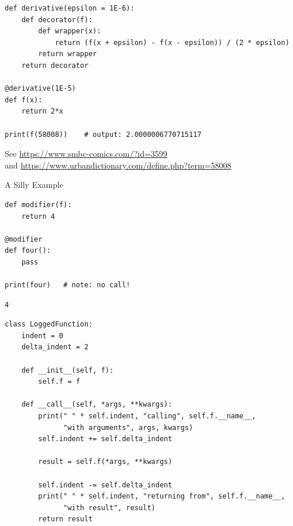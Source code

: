 \begin{frame}[fragile]
%
\begin{codebox}
\begin{verbatim}
def derivative(epsilon = 1E-6):
    def decorator(f):
        def wrapper(x):
            return (f(x + epsilon) - f(x - epsilon)) / (2 * epsilon)
        return wrapper
    return decorator

@derivative(1E-5)
def f(x):
    return 2*x

print(f(58008))    # output: 2.0000006770715117
\end{verbatim}
\end{codebox}
%
\begin{hintbox}
\footnotesize
See \url{https://www.smbc-comics.com/?id=3599} \\
and \url{https://www.urbandictionary.com/define.php?term=58008}
\end{hintbox}
%
\end{frame}


\begin{frame}[fragile]{A Silly Example}
%
\begin{codebox}
\begin{verbatim}
def modifier(f):
    return 4

@modifier
def four():
    pass

print(four)   # note: no call!
\end{verbatim}
\end{codebox}
%
\begin{cmdbox}
\begin{verbatim}
4
\end{verbatim}
\end{cmdbox}
%
\end{frame}


\begin{frame}[fragile]
%
\begin{codebox}
\begin{verbatim}
class LoggedFunction:
    indent = 0
    delta_indent = 2

    def __init__(self, f):
        self.f = f

    def __call__(self, *args, **kwargs):
        print(" " * self.indent, "calling", self.f.__name__,
              "with arguments", args, kwargs)
        self.indent += self.delta_indent

        result = self.f(*args, **kwargs)

        self.indent -= self.delta_indent
        print(" " * self.indent, "returning from", self.f.__name__,
              "with result", result)
        return result
\end{verbatim}
\end{codebox}
%
\end{frame}

